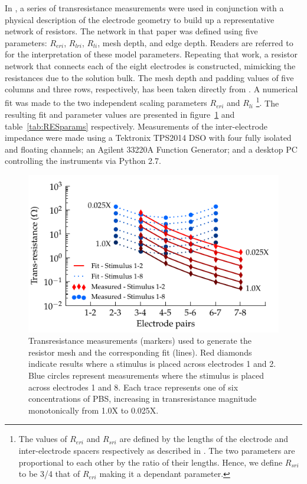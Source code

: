 \documentclass[journal, a4paper]{IEEEtran}
\begin{document}
In \cite{ScottSingle2013}, a series of transresistance measurements were used in conjunction with a physical description of the electrode geometry to build up a representative network of resistors. The network in that paper was defined using five parameters: $R_{eri}$, $R_{lri}$, $R_{li}$, mesh depth, and edge depth. Readers are referred to \cite{ScottSingle2013} for the interpretation of these model parameters. Repeating that work, a resistor network that connects each of the eight electrodes is constructed, mimicking the resistances due to the solution bulk.
{
    \color{blue}
The mesh depth and padding values of five columns and three rows, respectively, has been taken directly from \cite{ScottSingle2013}.
A numerical fit was made to the two independent scaling parameters $R_{eri}$ and $R_{li}$
\footnote{The values of $R_{eri}$ and $R_{sri}$ are defined by the lengths of the electrode and inter-electrode spacers respectively as described in \cite{ScottSingle2013}. The two parameters are proportional to each other by the ratio of their lengths. Hence, we define $R_{sri}$ to be 3/4 that of $R_{eri}$ making it a dependant parameter.}.
}
The resulting fit and parameter values are presented in figure~\ref{fig:transresistance} and table~\ref{tab:RESparams} respectively. 
{
    \color{blue}
Measurements of the inter-electrode impedance were made using a Tektronix TPS2014 DSO with four fully isolated and floating channels; an Agilent 33220A Function Generator; and a desktop PC controlling the instruments via Python 2.7.
}

\begin{figure}
    \begin{center}
        \includegraphics{graphics/pbs_transimpedance_IEEE}
    \end{center}
    \caption{Transresistance measurements (markers) used to generate the resistor mesh and the corresponding fit (lines). Red diamonds indicate results where a stimulus is placed across electrodes 1 and 2. Blue circles represent measurements where the stimulus is placed across electrodes 1 and 8. Each trace represents one of six concentrations of PBS, increasing in transresistance magnitude monotonically from 1.0X to 0.025X.}
    \label{fig:transresistance}
\end{figure}
\end{document}
